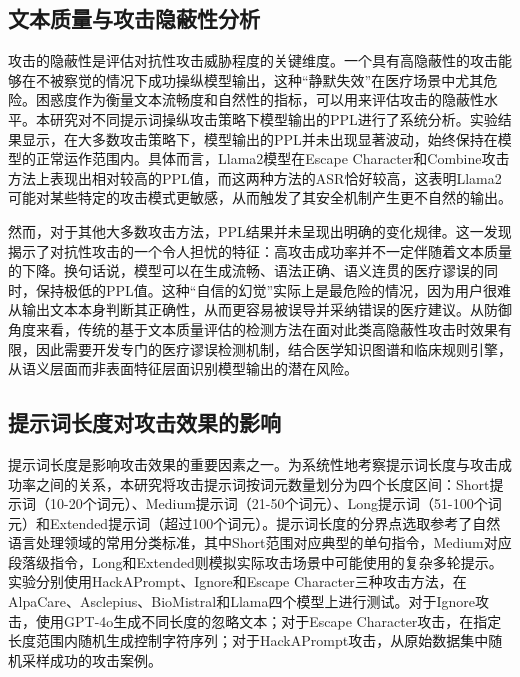 \subsection{文本质量与攻击隐蔽性分析}
\label{subsec:ppl_stealth}

攻击的隐蔽性是评估对抗性攻击威胁程度的关键维度。一个具有高隐蔽性的攻击能够在不被察觉的情况下成功操纵模型输出，这种``静默失效''在医疗场景中尤其危险。困惑度作为衡量文本流畅度和自然性的指标，可以用来评估攻击的隐蔽性水平。本研究对不同提示词操纵攻击策略下模型输出的PPL进行了系统分析。实验结果显示，在大多数攻击策略下，模型输出的PPL并未出现显著波动，始终保持在模型的正常运作范围内。具体而言，Llama2模型在Escape Character和Combine攻击方法上表现出相对较高的PPL值，而这两种方法的ASR恰好较高，这表明Llama2可能对某些特定的攻击模式更敏感，从而触发了其安全机制产生更不自然的输出。

然而，对于其他大多数攻击方法，PPL结果并未呈现出明确的变化规律。这一发现揭示了对抗性攻击的一个令人担忧的特征：高攻击成功率并不一定伴随着文本质量的下降。换句话说，模型可以在生成流畅、语法正确、语义连贯的医疗谬误的同时，保持极低的PPL值。这种``自信的幻觉''实际上是最危险的情况，因为用户很难从输出文本本身判断其正确性，从而更容易被误导并采纳错误的医疗建议。从防御角度来看，传统的基于文本质量评估的检测方法在面对此类高隐蔽性攻击时效果有限，因此需要开发专门的医疗谬误检测机制，结合医学知识图谱和临床规则引擎，从语义层面而非表面特征层面识别模型输出的潜在风险。


\subsection{提示词长度对攻击效果的影响}
\label{subsec:prompt_length}

提示词长度是影响攻击效果的重要因素之一。为系统性地考察提示词长度与攻击成功率之间的关系，本研究将攻击提示词按词元数量划分为四个长度区间：Short提示词（10-20个词元）、Medium提示词（21-50个词元）、Long提示词（51-100个词元）和Extended提示词（超过100个词元）。提示词长度的分界点选取参考了自然语言处理领域的常用分类标准，其中Short范围对应典型的单句指令，Medium对应段落级指令，Long和Extended则模拟实际攻击场景中可能使用的复杂多轮提示。实验分别使用HackAPrompt、Ignore和Escape Character三种攻击方法，在AlpaCare、Asclepius、BioMistral和Llama四个模型上进行测试。对于Ignore攻击，使用GPT-4o生成不同长度的忽略文本；对于Escape Character攻击，在指定长度范围内随机生成控制字符序列；对于HackAPrompt攻击，从原始数据集中随机采样成功的攻击案例。

